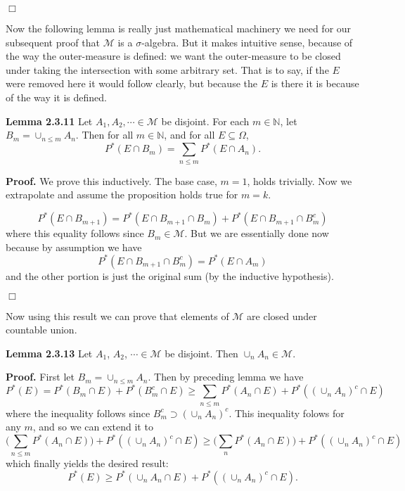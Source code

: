 \documentclass{article}
\begin{document}
\hfill $\Box$

\medskip

Now the following lemma is really just mathematical machinery we need for our subsequent proof that $\mathcal{M}$ is a $\sigma$-algebra. But it makes intuitive sense, because of the way the outer-measure is defined: we want the outer-measure to be closed under taking the intersection with some arbitrary set. That is to say, if the $E$ were removed here it would follow clearly, but because the $E$ is there it is because of the way it is defined. 

\medskip

\noindent \textbf{Lemma 2.3.11} Let $A_1, A_2, \cdots \in \mathcal{M}$ be disjoint. For each $m \in \mathbb{N}$, let $B_m = \cup_{n \leq m} A_n$. Then for all $m \in \mathbb{N}$, and for all $E \subseteq \Omega$, \[P^*(E \cap B_m) = \sum_{n \leq m} P^*(E \cap A_n). \]

\medskip

\noindent \textbf{Proof.} We prove this inductively. The base case, $m = 1$, holds trivially. Now we extrapolate and assume the proposition holds true for $m = k$. 

\[P^*(E \cap B_{m+1}) = P^*(E \cap B_{m+1} \cap B_m) + P^*(E \cap B_{m+1} \cap B_m^c) \] where this equality follows since  $B_m \in \mathcal{M}$.  But we are essentially done now because by assumption we have \[P^*(E \cap B_{m+1} \cap B_m^c) =  P^*(E \cap A_m)\] and the other portion is just the original sum (by the inductive hypothesis). 

\hfill $\Box$

\medskip

Now using this result we can prove that elements of $\mathcal{M}$ are closed under countable union. 

\medskip

\noindent \textbf{Lemma 2.3.13} Let $A_1$, $A_2$, $\cdots \in \mathcal{M}$ be disjoint. Then $\cup_n A_n \in \mathcal{M}$.  

\medskip

\noindent \textbf{Proof.} First let $B_m = \cup_{n \leq m} A_n$. Then by preceding lemma we have \[P^*(E) = P^*(B_m \cap E) + P^*(B_m^c \cap E) \geq \sum_{n \leq m} P^*(A_n \cap E) + P^*((\cup_n A_n)^c \cap E)\] where the inequality follows since $B_m^c \supset (\cup_n A_n)^c$. This inequality folows for any $m$, and so we can extend it to \[\bigg( \sum_{n \leq m} P^*(A_n \cap E) \bigg) + P^*((\cup_n A_n)^c \cap E) \geq \bigg( \sum_{n} P^*(A_n \cap E) \bigg) + P^*((\cup_n A_n)^c \cap E)\] which finally yields the desired result: \[ P^*(E) \geq P^*(\cup_n A_n \cap E) + P^*((\cup_n A_n)^c \cap E).\]
\end{document}
